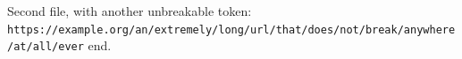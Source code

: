 Second file, with another unbreakable token: \texttt{https://example.org/an/extremely/long/url/that/does/not/break/anywhere/at/all/ever} end.
